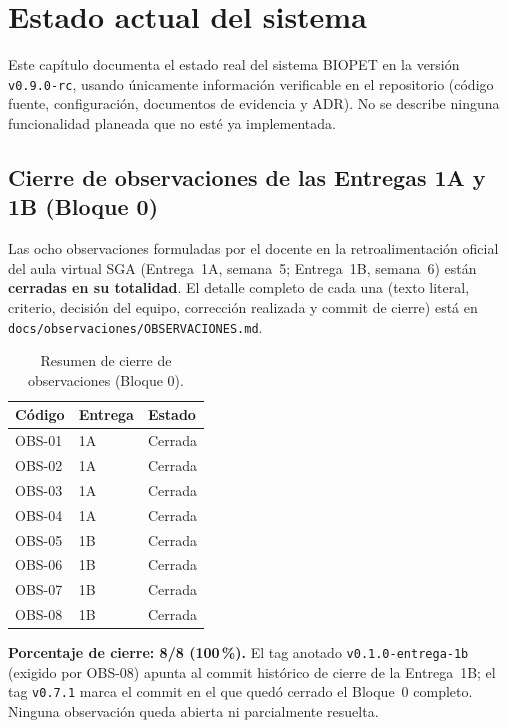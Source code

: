 \chapter{Estado actual del sistema}
\label{cap:estado-sistema}

Este cap\'itulo documenta el estado real del sistema BIOPET en la versi\'on
\texttt{v0.9.0-rc}, usando \'unicamente informaci\'on verificable en el
repositorio (c\'odigo fuente, configuraci\'on, documentos de evidencia y
ADR). No se describe ninguna funcionalidad planeada que no est\'e ya
implementada.

\section{Cierre de observaciones de las Entregas 1A y 1B (Bloque 0)}
\label{sec:cierre-observaciones}

Las ocho observaciones formuladas por el docente en la retroalimentaci\'on
oficial del aula virtual SGA (Entrega~1A, semana~5; Entrega~1B, semana~6)
est\'an \textbf{cerradas en su totalidad}. El detalle completo de cada una
(texto literal, criterio, decisi\'on del equipo, correcci\'on realizada y
commit de cierre) est\'a en \texttt{docs/observaciones/OBSERVACIONES.md}.

\begin{table}[H]
  \centering
  \caption{Resumen de cierre de observaciones (Bloque 0).}
  \label{tab:cierre-observaciones}
  \begin{tabular}{@{}lll@{}}
    \toprule
    C\'odigo & Entrega & Estado \\
    \midrule
    OBS-01 & 1A & Cerrada \\
    OBS-02 & 1A & Cerrada \\
    OBS-03 & 1A & Cerrada \\
    OBS-04 & 1A & Cerrada \\
    OBS-05 & 1B & Cerrada \\
    OBS-06 & 1B & Cerrada \\
    OBS-07 & 1B & Cerrada \\
    OBS-08 & 1B & Cerrada \\
    \bottomrule
  \end{tabular}
\end{table}

\textbf{Porcentaje de cierre: 8/8 (100\,\%).} El tag anotado
\texttt{v0.1.0-entrega-1b} (exigido por OBS-08) apunta al commit hist\'orico
de cierre de la Entrega~1B; el tag \texttt{v0.7.1} marca el commit en el que
qued\'o cerrado el Bloque~0 completo. Ninguna observaci\'on queda abierta ni
parcialmente resuelta.

